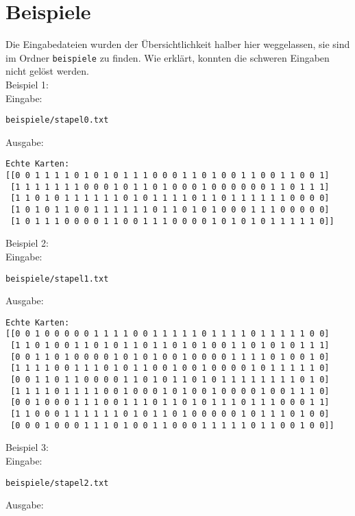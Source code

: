 \documentclass[a4paper,10pt,ngerman]{scrartcl}
\begin{document}
\section{Beispiele}
Die Eingabedateien wurden der Übersichtlichkeit halber hier weggelassen, sie sind im Ordner \lstinline|beispiele| zu finden. Wie erklärt, konnten die schweren Eingaben nicht gelöst werden.\\
Beispiel 1: \\
Eingabe:
\begin{lstlisting}
beispiele/stapel0.txt
\end{lstlisting}
Ausgabe:
\begin{lstlisting}
Echte Karten:
[[0 0 1 1 1 1 0 1 0 1 0 1 1 1 0 0 0 1 1 0 1 0 0 1 1 0 0 1 1 0 0 1] 
 [1 1 1 1 1 1 1 0 0 0 1 0 1 1 0 1 0 0 0 1 0 0 0 0 0 0 1 1 0 1 1 1] 
 [1 1 0 1 0 1 1 1 1 1 1 0 1 0 1 1 1 1 0 1 1 0 1 1 1 1 1 1 0 0 0 0] 
 [1 0 1 0 1 1 0 0 1 1 1 1 1 1 0 1 1 0 1 0 1 0 0 0 1 1 1 0 0 0 0 0] 
 [1 0 1 1 1 0 0 0 0 1 1 0 0 1 1 1 0 0 0 0 1 0 1 0 1 0 1 1 1 1 1 0]]
\end{lstlisting}
Beispiel 2: \\
Eingabe:
\begin{lstlisting}
beispiele/stapel1.txt
\end{lstlisting}
Ausgabe:
\begin{lstlisting}
Echte Karten:
[[0 0 1 0 0 0 0 0 1 1 1 1 0 0 1 1 1 1 1 0 1 1 1 1 0 1 1 1 1 1 0 0]
 [1 1 0 1 0 0 1 1 0 1 0 1 1 0 1 1 0 1 0 1 0 0 1 1 0 1 0 1 0 1 1 1]
 [0 0 1 1 0 1 0 0 0 0 1 0 1 0 1 0 0 1 0 0 0 0 1 1 1 1 0 1 0 0 1 0]
 [1 1 1 1 0 0 1 1 1 0 1 0 1 1 0 0 1 0 0 1 0 0 0 0 1 0 1 1 1 1 1 0]
 [0 0 1 1 0 1 1 0 0 0 0 1 1 0 1 0 1 1 0 1 0 1 1 1 1 1 1 1 1 0 1 0]
 [1 1 1 1 0 1 1 1 1 0 0 1 0 0 0 1 0 1 0 0 1 0 0 0 0 1 0 0 1 1 1 0]
 [0 0 1 0 0 0 1 1 1 0 0 1 1 1 0 1 1 0 1 0 1 1 1 0 1 1 1 0 0 0 1 1]
 [1 1 0 0 0 1 1 1 1 1 1 0 1 0 1 1 0 1 0 0 0 0 0 1 0 1 1 1 0 1 0 0]
 [0 0 0 1 0 0 0 1 1 1 0 1 0 0 1 1 0 0 0 1 1 1 1 1 0 1 1 0 0 1 0 0]]
\end{lstlisting}
Beispiel 3: \\
Eingabe:
\begin{lstlisting}
beispiele/stapel2.txt
\end{lstlisting}
Ausgabe:
\end{document}
